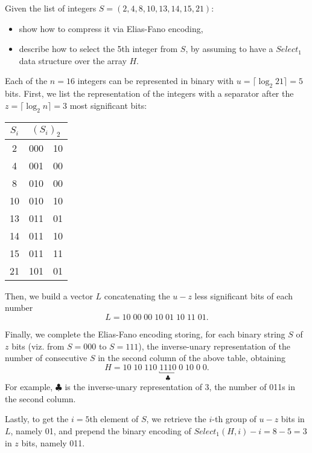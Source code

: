 \exercise

Given the list of integers $S=(2,4,8,10,13,14,15,21)$:
%
\begin{itemize}
  \item show how to compress it via Elias-Fano encoding,
  \item describe how to select the 5th integer from $S$, by assuming to have a $Select_1$ data structure over the array $H$.
\end{itemize}

\solution
\label{09_posting_compression:elias}

Each of the $n=16$ integers can be represented in binary with $u=\lceil\log_2
21\rceil=5$ bits. First, we list the representation of the integers with a
separator after the $z=\lceil\log_2n\rceil=3$ most significant bits:
%
\begin{center}
  \begin{tabular}{ c | r | l }
    $S_i$ & \multicolumn{2}{c}{$(S_i)_2$} \\ \hline
     2 & 000 & 10 \\
     4 & 001 & 00 \\
     8 & 010 & 00 \\
    10 & 010 & 10 \\
    13 & 011 & 01 \\
    14 & 011 & 10 \\
    15 & 011 & 11 \\
    21 & 101 & 01
  \end{tabular}
\end{center}
%
Then, we build a vector  $L$ concatenating the $u-z$ less significant bits of
each number
%
$$L = 10\; 00\; 00\; 10\; 01\; 10\; 11\; 01.$$

Finally, we complete the Elias-Fano encoding storing, for each binary string $S$
of $z$ bits (viz. from $S=000$ to $S=111$), the inverse-unary representation of
the number of consecutive $S$ in the second column of the above table, obtaining
%
$$H=10\;10\;110\;\underbracket{1110}_{\clubsuit}\;0\;10\;0\;0.$$
%
For example, $\clubsuit$ is the inverse-unary representation of 3, the number of
011s in the second column.

Lastly, to get the $i=5$th element of $S$, we retrieve the $i$-th group of $u-z$
bits in $L$, namely 01, and prepend the binary encoding of $Select_1(H,
i)-i=8-5=3$ in $z$ bits, namely 011.

